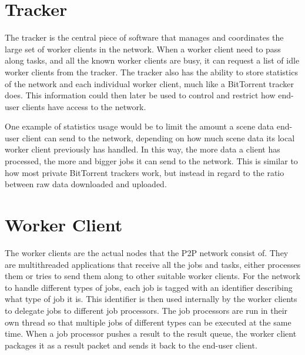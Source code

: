 \section{Tracker}
The tracker is the central piece of software that manages and coordinates the large set of worker clients in the network.
When a worker client need to pass along tasks, and all the known worker clients are busy, it can request a list of idle worker clients from the tracker. The tracker also has the ability to store statistics of the network and each individual worker client, much like a BitTorrent tracker does. This information could then later be used to control and restrict how end-user clients have access to the network. 

One example of statistics usage would be to limit the amount a scene data end-user client can send to the network, depending on how much scene data its local worker client previously has handled. In this way, the more data a client has processed, the more and bigger jobs it can send to the network. This is similar to how most private BitTorrent trackers work, but instead in regard to the ratio between raw data downloaded and uploaded.



\section{Worker Client}
The worker clients are the actual nodes that the P2P network consist of. They are multithreaded  applications that receive all the jobs and tasks, either processes them or tries to send them along to other suitable worker clients. For the network to handle different types of jobs, each job is tagged with an identifier describing what type of job it is. This identifier is then used internally by the worker clients to delegate jobs to different job processors. The job processors are run in their own thread so that multiple jobs of different types can be executed at the same time. When a job processor pushes a result to the result queue, the worker client packages it as a result packet and sends it back to the end-user client.


